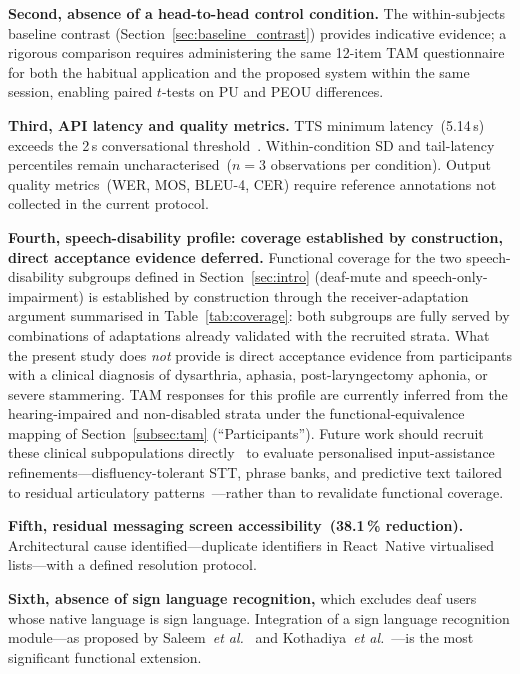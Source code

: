 \documentclass[journal]{IEEEtran}
\begin{document}
	\textbf{Second, absence of a head-to-head control condition.}
	The within-subjects baseline contrast (Section~\ref{sec:baseline_contrast})
	provides indicative evidence; a rigorous comparison requires
	administering the same 12-item TAM questionnaire for both the
	habitual application and the proposed system within the same session,
	enabling paired $t$-tests on PU and PEOU differences.
	
	\textbf{Third, API latency and quality metrics.}
	TTS minimum latency~(5.14\,s) exceeds the 2\,s conversational
	threshold~\cite{tan2021}. Within-condition SD and tail-latency
	percentiles remain uncharacterised~($n{=}3$ observations per
	condition). Output quality metrics~(WER, MOS, BLEU-4, CER) require
	reference annotations not collected in the current protocol.
	
	\textbf{Fourth, speech-disability profile: coverage established by construction, direct acceptance evidence deferred.} Functional coverage for the two speech-disability subgroups defined in Section~\ref{sec:intro} (deaf-mute and speech-only-impairment) is established by construction through the receiver-adaptation argument summarised in Table~\ref{tab:coverage}: both subgroups are fully served by combinations of adaptations already validated with the recruited strata. What the present study does \emph{not} provide is direct acceptance evidence from participants with a clinical diagnosis of dysarthria,
	aphasia, post-laryngectomy aphonia, or severe stammering. TAM responses for this profile are currently inferred from the hearing-impaired and non-disabled strata under the functional-equivalence mapping of Section~\ref{subsec:tam} (``Participants''). Future work should recruit these clinical subpopulations
	directly~\cite{bleakley2022,costanzo2023} to evaluate personalised input-assistance refinements---disfluency-tolerant STT, phrase banks, and predictive text tailored to residual articulatory patterns~\cite{elsahar2019,mateos2022}---rather than to revalidate functional coverage.
	
	\textbf{Fifth, residual messaging screen accessibility~(38.1\,\%
		reduction).} Architectural cause identified---duplicate identifiers
	in React~Native virtualised lists---with a defined resolution protocol.
	
	\textbf{Sixth, absence of sign language recognition,}
	which excludes deaf users whose native language is sign language.
	Integration of a sign language recognition module---as proposed by
	Saleem~\textit{et al.}~\cite{saleem2023} and
	Kothadiya~\textit{et al.}~\cite{kothadiya2022}---is the most
	significant functional extension.
	
\end{document}

